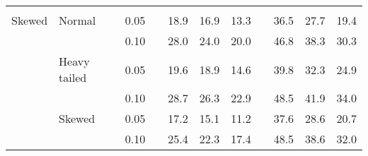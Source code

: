 \begin{table}[ht]
\begin{scriptsize}
\begin{center}
\begin{tabular}{ll p{.1cm} c p{.1cm} rrr p{.1cm} rrr}
&&&&&&&&&&&\\
Skewed       & Normal       && 0.05 &&   18.9 & 16.9 & 13.3 &   & 36.5 & 27.7 & 19.4 \\ 
             &              && 0.10 &&   28.0 & 24.0 & 20.0 &   & 46.8 & 38.3 & 30.3 \\ 
             & Heavy tailed && 0.05 &&   19.6 & 18.9 & 14.6 &   & 39.8 & 32.3 & 24.9 \\ 
             &              && 0.10 &&   28.7 & 26.3 & 22.9 &   & 48.5 & 41.9 & 34.0 \\ 
             & Skewed       && 0.05 &&   17.2 & 15.1 & 11.2 &   & 37.6 & 28.6 & 20.7 \\ 
             &              && 0.10 &&   25.4 & 22.3 & 17.4 &   & 48.5 & 38.6 & 32.0 \\ 



\end{tabular}
\end{center}
\end{scriptsize}
\end{table}
